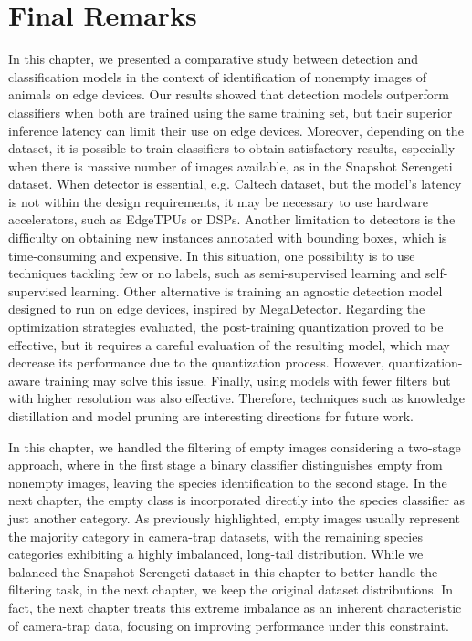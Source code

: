 \section{Final Remarks}

In this chapter, we presented a comparative study between detection and
classification models in the context of identification of nonempty images of
animals on edge devices. Our results showed that detection models outperform
classifiers when both are trained using the same training set, but their
superior inference latency can limit their use on edge devices. Moreover,
depending on the dataset, it is possible to train classifiers to obtain
satisfactory results, especially when there is massive number of images
available, as in the Snapshot Serengeti dataset. When detector is essential,
e.g. Caltech dataset, but the model's latency is not within the design
requirements, it may be necessary to use hardware accelerators, such as
EdgeTPUs or DSPs. Another limitation to detectors is the difficulty on obtaining
new instances annotated with bounding boxes, which is time-consuming and
expensive. In this situation, one possibility is to use techniques tackling few
or no labels, such as semi-supervised learning and self-supervised learning.
Other alternative is training an agnostic detection model designed to run on
edge devices, inspired by MegaDetector. Regarding the optimization strategies
evaluated, the post-training quantization proved to be effective, but it
requires a careful evaluation of the resulting model, which may decrease its
performance due to the quantization process. However, quantization-aware
training may solve this issue. Finally, using models with fewer filters but
with higher resolution was also effective. Therefore, techniques such as
knowledge distillation and model pruning are interesting directions for future
work.

In this chapter, we handled the filtering of empty images considering a two-stage
approach, where in the first stage a binary classifier distinguishes empty from 
nonempty images, leaving the species identification to the second stage. In the next 
chapter, the empty class is incorporated directly into the species classifier as 
just another category. As previously highlighted, empty images usually represent the
majority category in camera-trap datasets, with the remaining species categories
exhibiting a highly imbalanced, long-tail distribution. While we balanced the 
Snapshot Serengeti dataset in this chapter to better handle the filtering task, in 
the next chapter, we keep the original dataset distributions. In fact, the next 
chapter treats this extreme imbalance as an inherent characteristic of camera-trap 
data, focusing on improving performance under this constraint.
